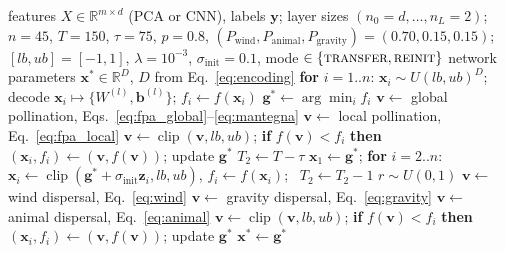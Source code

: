 \documentclass[10pt,letterpaper]{article}
\newcommand{\R}{\mathbb{R}}
\newcommand{\clip}{\operatorname{clip}}
\begin{document}
\begin{algorithm}[!t]
\caption{Sequential hybrid FPA--SDA for network-weight optimisation}\label{alg:hybrid}
\footnotesize
\begin{algorithmic}[1]
\Require features $X\in\R^{m\times d}$ (PCA or CNN), labels $\mathbf{y}$; layer sizes $(n_0{=}d,\dots,n_L{=}2)$;\Statex \hspace{\algorithmicindent} $n{=}45$, $T{=}150$, $\tau{=}75$, $p{=}0.8$, $(P_{\mathrm{wind}},P_{\mathrm{animal}},P_{\mathrm{gravity}}){=}(0.70,0.15,0.15)$;\Statex \hspace{\algorithmicindent} $[lb,ub]{=}[-1,1]$, $\lambda{=}10^{-3}$, $\sigma_{\mathrm{init}}{=}0.1$, mode $\in\{\textsc{transfer},\textsc{reinit}\}$
\Ensure network parameters $\mathbf{x}^{*}\in\R^{D}$, $D$ from Eq.~\eqref{eq:encoding}
\State \textbf{for} $i=1..n$: $\mathbf{x}_i\sim U(lb,ub)^D$; decode $\mathbf{x}_i\mapsto\{W^{(l)},\mathbf{b}^{(l)}\}$; $f_i\gets f(\mathbf{x}_i)$ 
\State $\mathbf{g}^{*}\gets\arg\min_i f_i$
 
     \State $\mathbf{v}\gets$ global pollination, Eqs.~\eqref{eq:fpa_global}--\eqref{eq:mantegna}
    \Else \State $\mathbf{v}\gets$ local pollination, Eq.~\eqref{eq:fpa_local}
    \EndIf
    \State $\mathbf{v}\gets\clip(\mathbf{v},lb,ub)$; \textbf{if} $f(\mathbf{v})< f_i$ \textbf{then} $(\mathbf{x}_i,f_i)\gets(\mathbf{v},f(\mathbf{v}))$; update $\mathbf{g}^{*}$
  \EndFor
\EndFor
\State $T_2\gets T-\tau$
 
  \State $\mathbf{x}_1\gets\mathbf{g}^{*}$; \textbf{for} $i=2..n$: $\mathbf{x}_i\gets\clip(\mathbf{g}^{*}+\sigma_{\mathrm{init}}\mathbf{z}_i,lb,ub)$, $f_i\gets f(\mathbf{x}_i)$; \ $T_2\gets T_2-1$
\EndIf {}
 
    \State $r\sim U(0,1)$
     \State $\mathbf{v}\gets$ wind dispersal, Eq.~\eqref{eq:wind}
     \State $\mathbf{v}\gets$ gravity dispersal, Eq.~\eqref{eq:gravity}
    \Else \State $\mathbf{v}\gets$ animal dispersal, Eq.~\eqref{eq:animal}
    \EndIf
    \State $\mathbf{v}\gets\clip(\mathbf{v},lb,ub)$; \textbf{if} $f(\mathbf{v})< f_i$ \textbf{then} $(\mathbf{x}_i,f_i)\gets(\mathbf{v},f(\mathbf{v}))$; update $\mathbf{g}^{*}$
  \EndFor
\EndFor
\State \Return $\mathbf{x}^{*}\gets\mathbf{g}^{*}$
\end{algorithmic}
\end{algorithm}
\end{document}
